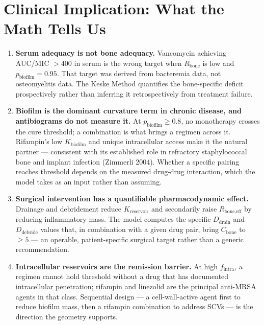 \documentclass[11pt]{article}
\begin{document}
\section{Clinical Implication: What the Math Tells Us}

\begin{enumerate}[leftmargin=1.4em]
  \item \textbf{Serum adequacy is not bone adequacy.} Vancomycin achieving
        AUC/MIC $> 400$ in serum is the wrong target when $R_{\text{bone}}$ is
        low and $p_{\text{biofilm}} = 0.95$. That target was derived from
        bacteremia data, not osteomyelitis data. The Keske Method quantifies the
        bone-specific deficit prospectively rather than inferring it
        retrospectively from treatment failure.

  \item \textbf{Biofilm is the dominant curvature term in chronic disease, and
        antibiograms do not measure it.} At $p_{\text{biofilm}} \geq 0.8$, no
        monotherapy crosses the cure threshold; a combination is what brings a
        regimen across it. Rifampin's low $K_{\text{biofilm}}$ and unique
        intracellular access make it the natural partner — consistent with its
        established role in refractory staphylococcal bone and implant infection
        (Zimmerli 2004). Whether a specific pairing reaches threshold depends on
        the measured drug-drug interaction, which the model takes as an input
        rather than assuming.

  \item \textbf{Surgical intervention has a quantifiable pharmacodynamic effect.}
        Drainage and debridement reduce $K_{\text{reservoir}}$ and secondarily
        raise $R_{\text{bone,eff}}$ by reducing inflammatory mass. The model
        computes the specific $D_{\text{drain}}$ and $D_{\text{debride}}$ values
        that, in combination with a given drug pair, bring $C_{\text{bone}}$ to
        $\geq 5$ — an operable, patient-specific surgical target rather than a
        generic recommendation.

  \item \textbf{Intracellular reservoirs are the remission barrier.} At high
        $f_{\text{intra}}$, a regimen cannot hold threshold without a drug that
        has documented intracellular penetration; rifampin and linezolid are the
        principal anti-MRSA agents in that class. Sequential design — a
        cell-wall-active agent first to reduce biofilm mass, then a rifampin
        combination to address SCVs — is the direction the geometry supports.
\end{enumerate}
\end{document}
